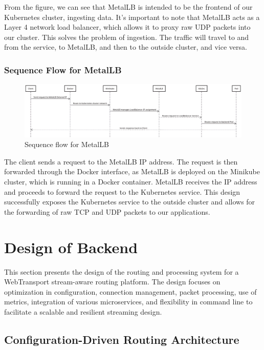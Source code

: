 From the figure, we can see that MetalLB is intended to be the frontend of our Kubernetes cluster, ingesting data. It's important to note that MetalLB acts as a Layer 4 network load balancer, which allows it to proxy raw UDP packets into our cluster. This solves the problem of ingestion. The traffic will travel to and from the service, to MetalLB, and then to the outside cluster, and vice versa.



\subsubsection{Sequence Flow for MetalLB}
\begin{figure}[H]
\caption{Sequence flow for MetalLB}
\centering
\includegraphics[width=1\textwidth]{Design/metal_sequence.png}
\end{figure}

The client sends a request to the MetalLB IP address. The request is then forwarded through the Docker interface, as MetalLB is deployed on the Minikube cluster, which is running in a Docker container. MetalLB receives the IP address and proceeds to forward the request to the Kubernetes service. This design successfully exposes the Kubernetes service to the outside cluster and allows for the forwarding of raw TCP and UDP packets to our applications.

\section{Design of Backend}

This section presents the design of the routing and processing system for a WebTransport stream-aware routing platform. The design focuses on optimization in configuration, connection management, packet processing, use of metrics, integration of various microservices, and flexibility in command line to facilitate a scalable and resilient streaming design.

\subsection{Configuration-Driven Routing Architecture}



